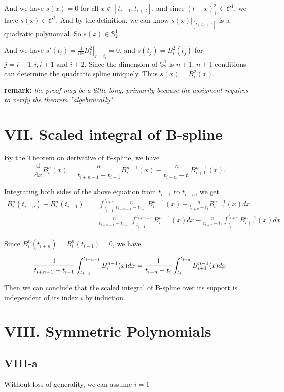 \documentclass[a4paper]{article}
\begin{document}
And we have $s(x)  = 0$ for all $x \notin [t_{i-1},t_{i+2}]$, and since $(t - x)_+^2 \in \mathcal{C}^1$, we have $s(x) \in \mathcal{C}^1$. And by the definition, we can know $\left. s(x)\right|_{[t_j,t_j+1]}$ is a quadratic polynomial. So $s(x) \in \mathbb{S}^1_2$.

And we have $s'(t_{i}) =\left. \frac{\text{d}}{\text{d}x} B_i^2\right|_{x=t_{i}} = 0 $, and $s(t_j) = B^2_i(t_j)$ for $j = i-1, i, i+1 \text{ and } i+2$. Since the dimension of $\mathbb{S}_2^1$ is $n+1$, $n+1$ conditions can determine the quadratic spline uniquely. Thus $s(x) = B^2_i(x)$.

\textbf{remark:} \textit{the proof may be a little long, primarily because the assigment requires to verify the theorem "algebraically"}
\section*{VII. Scaled integral of B-spline}
By the Theorem on derivative of B-spline, we have
\[
\frac{\text{d}}{\text{d}x} B_i^n(x) = \frac{n}{t_{i+n-1} - t_{i-1}}B_{i}^{n-1}(x) - \frac{n}{t_{i+n} - t_{i}}B_{i+1}^{n-1}(x).
\]

Integrating both sides of the above equation from $t_{i-1}$ to $t_{i+n}$, we get
\begin{align*}
  B_i^{n}(t_{i+n}) - B_i^{n}(t_{i-1})  & =  \int_{t_{i-1}}^{t_{i+n}} \frac{n}{t_{i+n-1} - t_{i-1}}B_{i}^{n-1}(x) - \frac{n}{t_{i+n} - t_{i}}B_{i+1}^{n-1}(x)dx\\  
          & = \frac{n}{t_{i+n-1}-t_{i-1}}\int_{t_{i-1}}^{t_{i+n-1}} B_{i}^{n-1}(x)dx - \frac{n}{t_{i+n} - t_{i}}\int_{t_{i}}^{t_{i+n}} B_{i+1}^{n-1}(x)dx\\
\end{align*}


Since $B_i^{n}(t_{i+n}) = B_i^{n}(t_{i-1}) = 0$, we have

\[
 \frac{1}{t_{i+n-1}-t_{i-1}}\int_{t_{i-1}}^{t_{i+n-1}} B_{i}^{n-1}(x)dx = \frac{1}{t_{i+n} - t_{i}}\int_{t_{i}}^{t_{i+n}} B_{i+1}^{n-1}(x)dx\\
\]

Then we can conclude that the scaled integral of B-spline over its support is independent of its index $i$ by induction.

\section*{VIII. Symmetric Polynomials}
\subsection*{VIII-a}
Without loss of generality, we can assume $i = 1$
\end{document}
